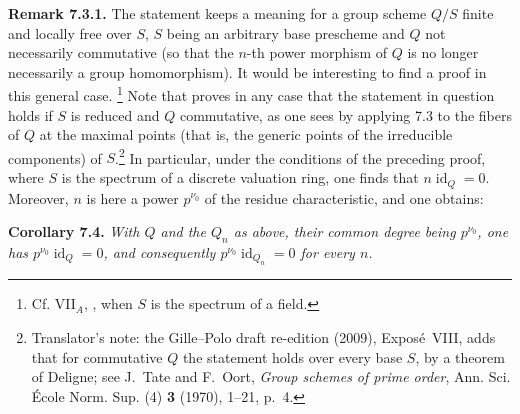 \medskip
\noindent{}\textbf{Remark 7.3.1.}
The statement  keeps a meaning for a
group scheme \(Q/S\) finite and locally free over \(S\), \(S\) being an
arbitrary base prescheme and \(Q\) not necessarily commutative (so that the
\(n\)-th power morphism of \(Q\) is no longer necessarily a group
homomorphism). It would be interesting to find a proof in this general
case.\begingroup
\renewcommand{\thefootnote}{(\(\ast\))}%
\footnote[0]{Cf. VII\(_A\), , when \(S\) is the spectrum of a field.}%
\endgroup{} Note that  proves in any case that the statement
in question holds if \(S\) is reduced and \(Q\) commutative, as one sees by
applying 7.3 to the fibers of \(Q\) at the maximal points (that is, the
generic points of the irreducible components) of \(S\).\footnote{Translator's note: the
Gille--Polo draft re-edition (2009), Expos\'e~VIII, adds that for commutative \(Q\) the statement
holds over every base \(S\), by a theorem of Deligne; see J.~Tate and F.~Oort, \emph{Group schemes of
prime order}, Ann. Sci. \'Ecole Norm. Sup. (4) \textbf{3} (1970), 1--21, p.~4.} In particular, under
the conditions of the preceding proof, where \(S\) is the spectrum of a
discrete valuation ring, one finds that \(n\operatorname{id}_Q=0\).
Moreover, \(n\) is here a power \(p^{\nu_0}\) of the residue
characteristic, and one obtains:

\medskip
\noindent{}\textbf{Corollary 7.4.}
\textit{With \(Q\) and the \(Q_n\) as above, their common degree being
\(p^{\nu_0}\), one has \(p^{\nu_0}\operatorname{id}_Q=0\), and consequently
\(p^{\nu_0}\operatorname{id}_{Q_n}=0\) for every \(n\).}
